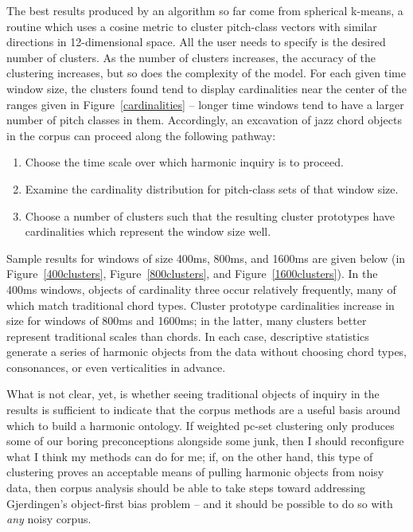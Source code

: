 The best results produced by an algorithm so far come from spherical k-means, a routine which uses a cosine metric to cluster pitch-class vectors with similar directions in 12-dimensional space.  All the user needs to specify is the desired number of clusters.  As the number of clusters increases, the accuracy of the clustering increases, but so does the complexity of the model.  For each given time window size, the clusters found tend to display cardinalities near the center of the ranges given in Figure~\ref{cardinalities} -- longer time windows tend to have a larger number of pitch classes in them.  Accordingly, an excavation of jazz chord objects in the corpus can proceed along the following pathway:
\begin{enumerate}
	\item Choose the time scale over which harmonic inquiry is to proceed.
	\item Examine the cardinality distribution for pitch-class sets of that window size.
	\item Choose a number of clusters such that the resulting cluster prototypes have cardinalities which represent the window size well.
\end{enumerate}
Sample results for windows of size 400ms, 800ms, and 1600ms are given below (in Figure~\ref{400clusters}, Figure~\ref{800clusters}, and Figure~\ref{1600clusters}).  In the 400ms windows, objects of cardinality three occur relatively frequently, many of which match traditional chord types.  Cluster prototype cardinalities increase in size for windows of 800ms and 1600ms; in the latter, many clusters better represent traditional scales than chords.  In each case, descriptive statistics generate a series of harmonic objects from the data without choosing chord types, consonances, or even verticalities in advance.

What is not clear, yet, is whether seeing traditional objects of inquiry in the results is sufficient to indicate that the corpus methods are a useful basis around which to build a harmonic ontology.  If weighted pc-set clustering only produces some of our boring preconceptions alongside some junk, then I should reconfigure what I think my methods can do for me; if, on the other hand, this type of clustering proves an acceptable means of pulling harmonic objects from noisy data, then corpus analysis should be able to take steps toward addressing Gjerdingen's object-first bias problem -- and it should be possible to do so with \emph{any} noisy corpus.

